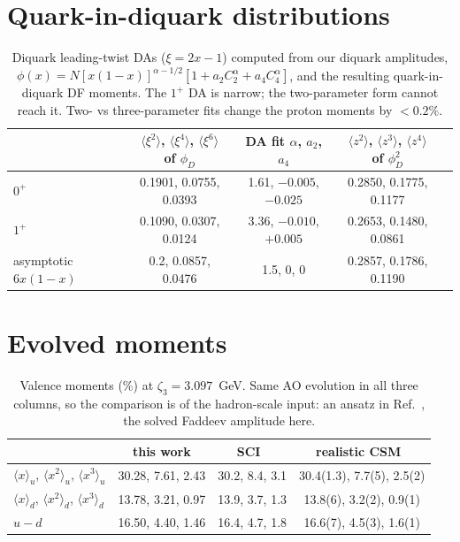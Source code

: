 \documentclass[11pt,a4paper]{article}
\newcommand{\mom}[1]{\langle #1\rangle}
\begin{document}
\section{Quark-in-diquark distributions}
\begin{table}[H]
\centering\small
\begin{tabular}{lcccc}
\toprule
 & $\mom{\xi^2}$, $\mom{\xi^4}$, $\mom{\xi^6}$ of $\phi_D$ & DA fit $\alpha$, $a_2$, $a_4$ & $\mom{z^2}$, $\mom{z^3}$, $\mom{z^4}$ of $\phi_D^2$\\
\midrule
$0^+$ & 0.1901, 0.0755, 0.0393 & 1.61, $-0.005$, $-0.025$ & 0.2850, 0.1775, 0.1177\\
$1^+$ & 0.1090, 0.0307, 0.0124 & 3.36, $-0.010$, $+0.005$ & 0.2653, 0.1480, 0.0861\\
asymptotic $6x(1-x)$ & 0.2, 0.0857, 0.0476 & 1.5, 0, 0 & 0.2857, 0.1786, 0.1190\\
\bottomrule
\end{tabular}
\caption{Diquark leading-twist DAs ($\xi = 2x-1$) computed from our diquark amplitudes,
$\phi(x) = N[x(1-x)]^{\alpha-1/2}[1 + a_2C_2^\alpha + a_4C_4^\alpha]$, and the resulting quark-in-diquark DF moments.
The $1^+$ DA is narrow; the two-parameter form cannot reach it. Two- vs three-parameter fits change the proton
moments by $< 0.2\%$.}
\end{table}

\section{Evolved moments}
\begin{table}[H]
\centering\small
\begin{tabular}{lccc}
\toprule
 & this work & SCI~\cite{EPJC84:739} & realistic CSM~\cite{Lu:2022cjx}\\
\midrule
$\mom{x}_u$, $\mom{x^2}_u$, $\mom{x^3}_u$ & 30.28, 7.61, 2.43 & 30.2, 8.4, 3.1 & 30.4(1.3), 7.7(5), 2.5(2)\\
$\mom{x}_d$, $\mom{x^2}_d$, $\mom{x^3}_d$ & 13.78, 3.21, 0.97 & 13.9, 3.7, 1.3 & 13.8(6), 3.2(2), 0.9(1)\\
$u-d$ & 16.50, 4.40, 1.46 & 16.4, 4.7, 1.8 & 16.6(7), 4.5(3), 1.6(1)\\
\bottomrule
\end{tabular}
\caption{Valence moments (\%) at $\zeta_3 = 3.097$~GeV. Same AO evolution in all three columns, so the comparison is of
the hadron-scale input: an ansatz in Ref.~\cite{Lu:2022cjx}, the solved Faddeev amplitude here.}
\end{table}
\end{document}
